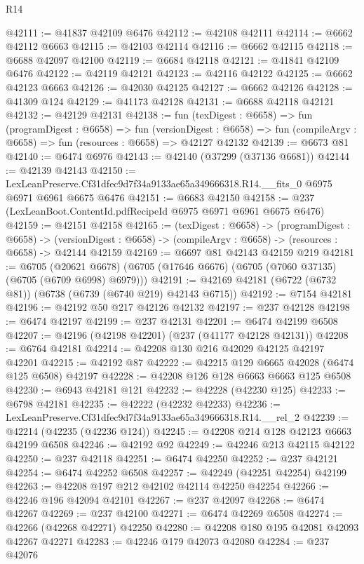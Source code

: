 \begin{lexlean}{R14}
\begin{coremodule}
@42111 := @41837 @42109 @6476
@42112 := @42108 @42111
@42114 := @6662 @42112 @6663
@42115 := @42103 @42114
@42116 := @6662 @42115
@42118 := @6688 @42097 @42100
@42119 := @6684 @42118
@42121 := @41841 @42109 @6476
@42122 := @42119 @42121
@42123 := @42116 @42122
@42125 := @6662 @42123 @6663
@42126 := @42030 @42125
@42127 := @6662 @42126
@42128 := @41309 @124
@42129 := @41173 @42128
@42131 := @6688 @42118 @42121
@42132 := @42129 @42131
@42138 := fun (texDigest : @6658) =>
  fun (programDigest : @6658) =>
  fun (versionDigest : @6658) =>
  fun (compileArgv : @6658) => fun (resources : @6658) => @42127 @42132
@42139 := @6673 @81
@42140 := @6474 @6976
@42143 := @42140 (@37299 (@37136 @6681))
@42144 := @42139 @42143
@42150 := LexLeanPreserve.Cf31dfec9d7f34a9133ae65a349666318.R14.__fits_0
    @6975
    @6971
    @6961
    @6675
    @6476
@42151 := @6683 @42150
@42158 := @237 (LexLeanBoot.ContentId.pdfRecipeId @6975 @6971 @6961 @6675 @6476)
@42159 := @42151 @42158
@42165 := (texDigest : @6658) ->
  (programDigest : @6658) ->
  (versionDigest : @6658) -> (compileArgv : @6658) -> (resources : @6658) -> @42144 @42159
@42169 := @6697 @81 @42143 @42159 @219
@42181 := @6705
    (@20621 @6678)
    (@6705 (@17646 @6676) (@6705 (@7060 @37135) (@6705 (@6709 @6998) @6979)))
@42191 := @42169 @42181 (@6722 (@6732 @81)) (@6738 (@6739 (@6740 @219) @42143 @6715))
@42192 := @7154 @42181
@42196 := @42192 @50 @217 @42126 @42132
@42197 := @237 @42128
@42198 := @6474 @42197
@42199 := @237 @42131
@42201 := @6474 @42199 @6508
@42207 := @42196 (@42198 @42201) (@237 (@41177 @42128 @42131))
@42208 := @6764 @42181
@42214 := @42208 @130 @216 @42029 @42125 @42197 @42201
@42215 := @42192 @87
@42222 := @42215 @129 @6665 @42028 (@6474 @125 @6508) @42197
@42228 := @42208 @126 @128 @6663 @6663 @125 @6508
@42230 := @6943 @42181 @121
@42232 := @42228 (@42230 @125)
@42233 := @6798 @42181
@42235 := @42222 (@42232 @42233)
@42236 := LexLeanPreserve.Cf31dfec9d7f34a9133ae65a349666318.R14.__rel_2
@42239 := @42214 (@42235 (@42236 @124))
@42245 := @42208 @214 @128 @42123 @6663 @42199 @6508
@42246 := @42192 @92
@42249 := @42246 @213 @42115 @42122
@42250 := @237 @42118
@42251 := @6474 @42250
@42252 := @237 @42121
@42254 := @6474 @42252 @6508
@42257 := @42249 (@42251 @42254) @42199
@42263 := @42208 @197 @212 @42102 @42114 @42250 @42254
@42266 := @42246 @196 @42094 @42101
@42267 := @237 @42097
@42268 := @6474 @42267
@42269 := @237 @42100
@42271 := @6474 @42269 @6508
@42274 := @42266 (@42268 @42271) @42250
@42280 := @42208 @180 @195 @42081 @42093 @42267 @42271
@42283 := @42246 @179 @42073 @42080
@42284 := @237 @42076

\end{coremodule}
\end{lexlean}
